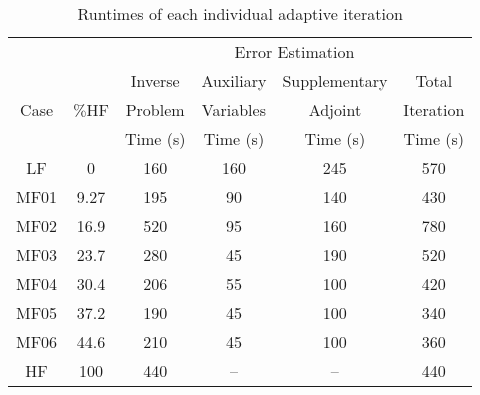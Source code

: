 \begin{table}
\caption{Runtimes of each individual adaptive iteration}
\label{tab:ref3D_dainty_timebreak}
\centering
\begin{tabular}{ccc|c|c|c}
\cline{4-5} 
 & & & \multicolumn{2}{|c|}{Error Estimation} & \\
\cline{1-6}
\multicolumn{1}{|c|}{\multirow{3}{*}{Case}} & \multicolumn{1}{|c|}{\multirow{3}{*}{$\%$HF}} & Inverse & Auxiliary & Supplementary & \multicolumn{1}{|c|}{Total} \\
\multicolumn{1}{|c|}{} & \multicolumn{1}{|c|}{} & Problem & Variables & Adjoint & \multicolumn{1}{|c|}{Iteration}\\
\multicolumn{1}{|c|}{} & \multicolumn{1}{|c|}{} & Time (s) &  Time (s) & Time (s) & \multicolumn{1}{|c|}{Time (s)}\\
\cline{1-6}
\multicolumn{1}{|c|}{LF}    & \multicolumn{1}{|c|}{0}     & 160 & 160 & 245 & \multicolumn{1}{|c|}{570} \\ \hline
\multicolumn{1}{|c|}{MF01}  & \multicolumn{1}{|c|}{9.27}  & 195 & 90 & 140 & \multicolumn{1}{|c|}{430} \\ \hline
\multicolumn{1}{|c|}{MF02}  & \multicolumn{1}{|c|}{16.9}  & 520 & 95 & 160 & \multicolumn{1}{|c|}{780} \\ \hline
\multicolumn{1}{|c|}{MF03}  & \multicolumn{1}{|c|}{23.7}  & 280 & 45 & 190 & \multicolumn{1}{|c|}{520} \\ \hline
\multicolumn{1}{|c|}{MF04}  & \multicolumn{1}{|c|}{30.4}  & 206 & 55 & 100 & \multicolumn{1}{|c|}{420} \\ \hline
\multicolumn{1}{|c|}{MF05}  & \multicolumn{1}{|c|}{37.2}  & 190 & 45 & 100 & \multicolumn{1}{|c|}{340} \\ \hline
\multicolumn{1}{|c|}{MF06}  & \multicolumn{1}{|c|}{44.6}  & 210 & 45 & 100 & \multicolumn{1}{|c|}{360} \\ \hline
\multicolumn{1}{|c|}{HF}    & \multicolumn{1}{|c|}{100}   & 440 & -- & -- & \multicolumn{1}{|c|}{440} \\ \hline
\end{tabular}
\end{table}
%
